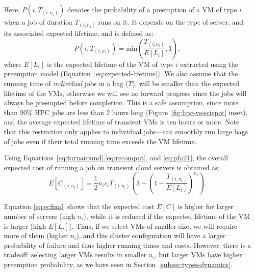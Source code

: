 Here, $P(i, T_{(i, n_i)})$ denotes the probability of a preemption of a VM of type $i$ when a job of duration $T_{(i, n_i)}$ runs on it. 
%
It depends on the type of server, and its associated expected lifetime, and is defined as:
\begin{equation}
  \label{eq:pi}
  P(i, T_{(i, n_i)}) = \text{min}\left(\dfrac{T_{(i, n_i)}}{E[L_i]}, 1\right),
\end{equation}
where $E[L_i]$ is the expected lifetime of the VM of type $i$ extracted using the preemption model (Equation~\ref{eq:expected-lifetime}).
We also assume that the running time of \emph{individual} jobs in a bag ($T$), will be smaller than the expected lifetime of the VMs, otherwise we will see no forward progress since the jobs will always be preempted before completion.
This is a safe assumption, since more than 90\% HPC jobs are less than 2 hours long (Figure~\ref{fig:hpc-vs-scispot} inset), and the average expected lifetime of transient VMs is ten hours or more.
Note that this restriction only applies to individual jobs---\sysname can smoothly run large bags of jobs even if their total running time exceeds the VM lifetime. 



Using Equations~\ref{eq:turnaround},\ref{eq:recomput}, and \ref{eq:pfail1}, the overall expected cost of running a job on transient cloud servers is obtained as:
\begin{equation}
  \label{eq:ecfinal}
  E[C_{( i,n_i )}] = \frac{1}{2}n_i c_i T_{( i,n_i )}\left(3 - \left(1-\dfrac{T_{( i,n_i )}}{E[L_i]}\right)^{n_i}\right).
\end{equation}

Equation \ref{eq:ecfinal} shows that the expected cost $E[C]$ is higher for larger number of servers (high $n_i$), while it is reduced if the expected lifetime of the VM is larger (high $E[L_i]$).
%
Thus, if we select VMs of smaller size, we will require more of them (higher $n_i$), and this cluster configuration will have a larger probability of failure and thus higher running times and costs.
However, there is a tradeoff: selecting larger VMs results in smaller $n_i$, but larger VMs have higher preemption probability, as we have seen in Section~\ref{subsec:types-dynamics}. 



